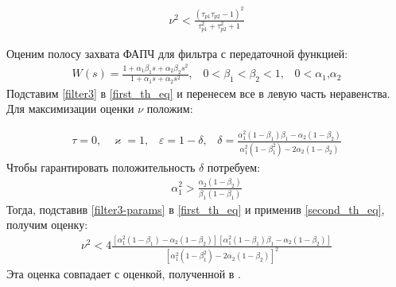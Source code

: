 \documentclass[a4paper,article,14pt]{extarticle}
\begin{document}
\begin{equation}\label{filter1_max}
 \begin{aligned}
\nu^2 < \frac{(\tau_{p1}\tau_{p2} - 1)^2}{\tau_{p1}^2 + \tau_{p2}^2 + 1}
 \end{aligned}
\end{equation} 

Оценим полосу захвата ФАПЧ для фильтра с передаточной функцией:\vspace{-1mm}
 \begin{equation}\label{filter3}
 \begin{aligned}
W(s) = \frac{1+\alpha_1\beta_1s + \alpha_2\beta_2s^2}{1+\alpha_1s + \alpha_2s^2} \text{,}\quad 0 < \beta_1 < \beta_2 < 1 \text{,}\quad 0 < \alpha_1 \text{,} \alpha_2
 \end{aligned}
\end{equation}
Подставим \eqref{filter3} в \eqref{first_th_eq} и перенесем все в левую часть неравенства. Для максимизации оценки $\nu$ положим: 

 \begin{equation}\label{filter3-params}
 \begin{aligned}
 \tau = 0 \text{,} \quad
 \varkappa = 1 \text{,} \quad
 \varepsilon = 1-\delta \text{,} \quad
 \delta = \frac{\alpha_1^2(1-\beta_1)\beta_1 - \alpha_2(1-\beta_2)}{\alpha_1^2(1-\beta_1^2) - 2\alpha_2(1-\beta_2)}
 \end{aligned}
\end{equation}
Чтобы гарантировать положительность $\delta$ потребуем:
 \begin{equation}\label{restriction-2}
 \begin{aligned}
\alpha_1^2 > \frac{\alpha_2(1-\beta_2)}{\beta_1(1-\beta_1)}
 \end{aligned}
\end{equation}
Тогда, подставив \eqref{filter3-params} в \eqref{first_th_eq} и применив \eqref{second_th_eq}, получим оценку:
 \begin{equation}
 \begin{aligned}
\nu^2 < 4\frac{[\alpha_1^2(1-\beta_1) - \alpha_2(1-\beta_2)][\alpha_1^2(1-\beta_1)\beta_1 - \alpha_2(1-\beta_2)]}{[\alpha_1^2(1-\beta_1^2) - 2\alpha_2(1-\beta_2)]^2}
 \end{aligned}
 \end{equation}
Эта оценка совпадает с оценкой, полученной в \cite{kuznetsov}.
\end{document}
